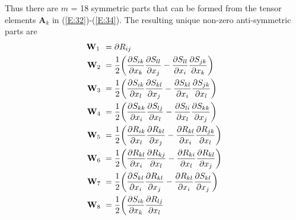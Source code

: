 Thus there are $m$ = 18 symmetric parts that can be formed from the tensor elements $\mathbf{A}_k$ in (\ref{E:32})-(\ref{E:34}). The resulting unique non-zero anti-symmetric parts are 	
%
\begin{subequations}
\label{E:37}
\begin{align}
	\mathmakebox[\widthof{$\mathbf{W}_{10}$}][l]{\mathbf{W}_1}
	&= \partial R_{ij}  \\
	\mathmakebox[\widthof{$\mathbf{M}_{10}$}][l]{\mathbf{W}_2}
	&= \frac{1}{2} 
			  \bigg( \frac{\partial S_{ik}}{\partial x_k}
					 \frac{\partial S_{ll}}{\partial x_j} 
				  	- 
					 \frac{\partial S_{ll}}{\partial x_i} 
					 \frac{\partial S_{jk}}{\partial x_k} \bigg) \\
	\mathmakebox[\widthof{$\mathbf{M}_{10}$}][l]{\mathbf{W}_3}
	&= \frac{1}{2} 
			  \bigg( \frac{\partial S_{ik}}{\partial x_l}
					 \frac{\partial S_{kl}}{\partial x_j} 
				    - 
					 \frac{\partial S_{kl}}{\partial x_i} 
					 \frac{\partial S_{jk}}{\partial x_l} \bigg) \\
	\mathmakebox[\widthof{$\mathbf{M}_{10}$}][l]{\mathbf{W}_4}
	&= \frac{1}{2} 
			  \bigg( \frac{\partial S_{kk}}{\partial x_i}
					 \frac{\partial S_{lj}}{\partial x_l} 
				  	- 
					 \frac{\partial S_{li}}{\partial x_l} 
					 \frac{\partial S_{kk}}{\partial x_j} \bigg) \\
	\mathmakebox[\widthof{$\mathbf{M}_{10}$}][l]{\mathbf{W}_5}
	&= \frac{1}{2} 
			  \bigg( \frac{\partial R_{ik}}{\partial x_l}
					 \frac{\partial R_{kl}}{\partial x_j} 
				  	- 
					 \frac{\partial R_{kl}}{\partial x_i} 
					 \frac{\partial R_{jk}}{\partial x_l} \bigg)  \\
	\mathmakebox[\widthof{$\mathbf{M}_{10}$}][l]{\mathbf{W}_6}
	&= \frac{1}{2} 
			  \bigg( \frac{\partial R_{kl}}{\partial x_i}
					 \frac{\partial R_{kj}}{\partial x_l} 
				  	- 
					 \frac{\partial R_{ki}}{\partial x_l}
					 \frac{\partial R_{kl}}{\partial x_j}  \bigg)  \\
	\mathmakebox[\widthof{$\mathbf{M}_{10}$}][l]{\mathbf{W}_7}
	&= \frac{1}{2} 
			  \bigg( \frac{\partial S_{kl}}{\partial x_i}
					 \frac{\partial R_{kl}}{\partial x_j} 
				  	- 
					 \frac{\partial R_{kl}}{\partial x_i} 
					 \frac{\partial S_{kl}}{\partial x_j} \bigg)  \\
	\mathmakebox[\widthof{$\mathbf{M}_{10}$}][l]{\mathbf{W}_8}
	&= \frac{1}{2} 
			  \bigg( \frac{\partial S_{ik}}{\partial x_k}
					 \frac{\partial R_{lj}}{\partial x_l} 

\end{align}
\end{subequations}
